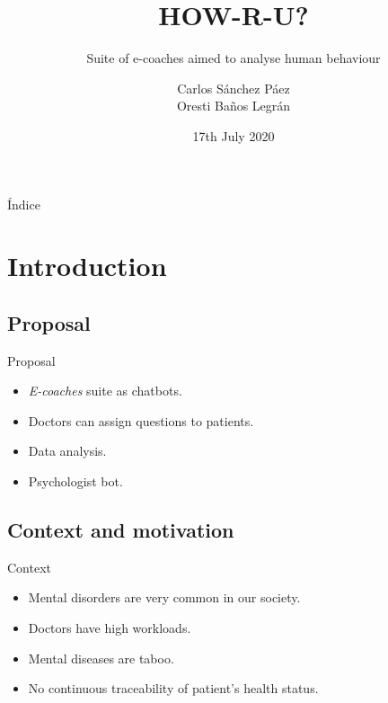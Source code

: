 \documentclass{beamer}
\title{HOW-R-U?}
\date{17th July 2020}
\subtitle{Suite of e-coaches aimed to analyse human behaviour}
\author{Carlos Sánchez Páez\\Oresti Baños Legrán}
\begin{document}
\centering
\begin{frame}
 \titlepage
\end{frame}

\begin{frame}{Índice}
 \tableofcontents
\end{frame}

\section{Introduction}
\subsection{Proposal}
\begin{frame}[fragile]{Proposal}
  \begin{itemize}[<+->]
    \item \emph{E-coaches} suite as chatbots.
    \item Doctors can assign questions to patients.
    \item Data analysis.
    \item Psychologist bot.
  \end{itemize}
\end{frame}
\subsection{Context and motivation}
\begin{frame}[fragile]{Context}
  \begin{itemize}[<+->]
    \item Mental disorders are very common in our society.
    \item Doctors have high workloads.
    \item Mental diseases are taboo.
    \item No continuous traceability of patient's health status.
  \end{itemize}
\end{frame}
\end{document}
